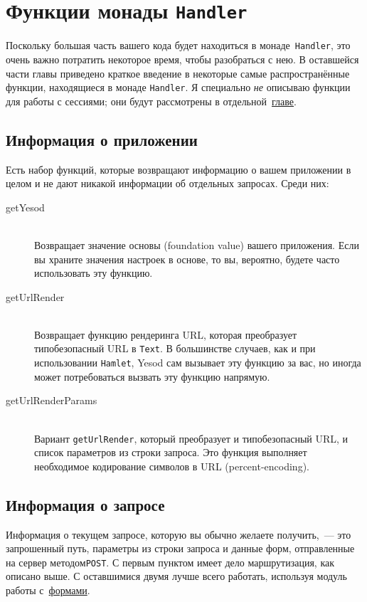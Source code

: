 \section{Функции монады \texttt{Handler}}
Поскольку большая часть вашего кода будет находиться в монаде~\lstinline'Handler',
это очень важно потратить некоторое время, чтобы разобраться с нею.
В оставшейся части главы приведено краткое введение в некоторые
самые распространённые функции, находящиеся в монаде
\lstinline!Handler!. Я специально \emph{не} описываю функции для работы с
сессиями; они будут рассмотрены в отдельной~\hyperref[chap:sessions]{главе}.

\subsection{Информация о приложении}
Есть набор функций, которые возвращают информацию о вашем приложении в
целом и не дают никакой информации об отдельных запросах. Среди них:
\begin{description}
\item[getYesod] \hfill \\
  Возвращает значение основы (foundation value) вашего приложения. Если вы храните
  значения настроек в основе, то вы, вероятно, будете часто использовать эту функцию.

\item[getUrlRender] \hfill \\
  Возвращает функцию рендеринга URL, которая преобразует типобезопасный URL в
  \lstinline!Text!. В большинстве случаев, как и при использовании \lstinline!Hamlet!,
  Yesod сам вызывает эту функцию за вас, но иногда может потребоваться вызвать эту функцию
  напрямую.

\item[getUrlRenderParams]  \hfill \\
  Вариант \lstinline!getUrlRender!, который преобразует и типобезопасный URL, и список
  параметров из строки запроса. Это функция выполняет необходимое кодирование символов в
  URL (percent-encoding).
\end{description}

\subsection{Информация о запросе}
Информация о текущем запросе, которую вы обычно желаете получить,~--- это запрошенный
путь, параметры из строки запроса и данные форм, отправленные на сервер методом\texttt{POST}. С
первым пунктом имеет дело маршрутизация, как описано выше. С оставшимися двумя лучше всего
работать, используя модуль работы с~\hyperref[chap:forms]{формами}.


